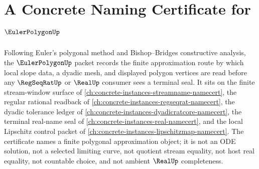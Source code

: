 \chapter{A Concrete Naming Certificate for $\EulerPolygonUp$}
\label{ch:concrete-instances-euler-polygon-namecert}

Following Euler's polygonal method and Bishop--Bridges constructive analysis, the $\EulerPolygonUp$ packet records the finite approximation route by which local slope data, a dyadic mesh, and displayed polygon vertices are read before any $\RegSeqRatUp$ or $\RealUp$ consumer sees a terminal seal. It sits on the finite stream-window surface of \autoref{ch:concrete-instances-streamname-namecert}, the regular rational readback of \autoref{ch:concrete-instances-regseqrat-namecert}, the dyadic tolerance ledger of \autoref{ch:concrete-instances-dyadicratcore-namecert}, the terminal real-name seal of \autoref{ch:concrete-instances-real-namecert}, and the local Lipschitz control packet of \autoref{ch:concrete-instances-lipschitzmap-namecert}. The certificate names a finite polygonal approximation object; it is not an ODE solution, not a selected limiting curve, not quotient stream equality, not host real equality, not countable choice, and not ambient $\RealUp$ completeness.

